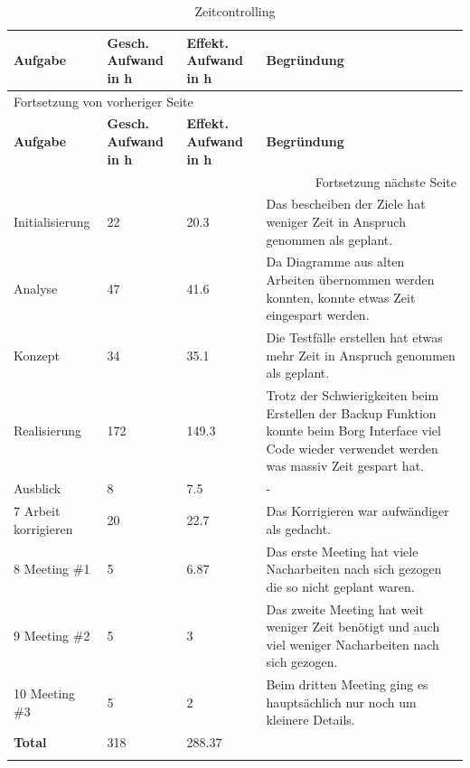 \begin{longtable}{|p{4cm}|p{1.5cm}|p{1.5cm}|p{6.5cm}|}
\hline
\textbf{Aufgabe}\cellcolor[HTML]{C0C0C0} & \textbf{Gesch. Aufwand in h}\cellcolor[HTML]{C0C0C0} & \textbf{Effekt. Aufwand in h}\cellcolor[HTML]{C0C0C0} & \textbf{Begründung}\cellcolor[HTML]{C0C0C0}\\
\hline
\endfirsthead
\multicolumn{4}{l}{Fortsetzung von vorheriger Seite} \\
\hline

\textbf{Aufgabe}\cellcolor[HTML]{C0C0C0} & \textbf{Gesch. Aufwand in h}\cellcolor[HTML]{C0C0C0} & \textbf{Effekt. Aufwand in h}\cellcolor[HTML]{C0C0C0} & \textbf{Begründung}\cellcolor[HTML]{C0C0C0} \\

\hline
\endhead
\hline\multicolumn{4}{r}{Fortsetzung nächste Seite} \\
\endfoot
\endlastfoot
\hline
Initialisierung & 22 & 20.3 & Das bescheiben der Ziele hat weniger Zeit in Anspruch genommen als geplant.\\
\hline
Analyse & 47 & 41.6 & Da Diagramme aus alten Arbeiten übernommen werden konnten, konnte etwas Zeit eingespart werden.\\
\hline
Konzept & 34 & 35.1 & Die Testfälle erstellen hat etwas mehr Zeit in Anspruch genommen als geplant.\\
\hline
Realisierung & 172 & 149.3 & Trotz der Schwierigkeiten beim Erstellen der Backup Funktion konnte beim Borg Interface viel Code wieder verwendet werden was massiv Zeit gespart hat.\\
\hline
Ausblick & 8 & 7.5 & -\\
\hline
7 Arbeit korrigieren & 20 & 22.7 & Das Korrigieren war aufwändiger als gedacht.\\
\hline
8 Meeting \#1 & 5 & 6.87 & Das erste Meeting hat viele Nacharbeiten nach sich gezogen die so nicht geplant waren.\\
\hline
9 Meeting \#2 & 5 & 3 & Das zweite Meeting hat weit weniger Zeit benötigt und auch viel weniger Nacharbeiten nach sich gezogen.\\
\hline
10 Meeting \#3 & 5 & 2 & Beim dritten Meeting ging es hauptsächlich nur noch um kleinere Details.\\
\hline
\textbf{Total} & 318 & 288.37 & \\
\hline
\caption{\label{tab:orgdc653bf}
Zeitcontrolling}
\\
\end{longtable}

